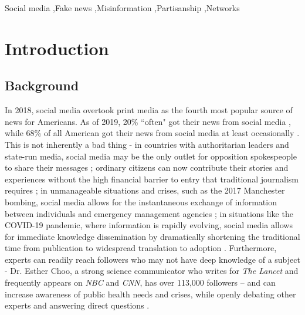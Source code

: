 \documentclass[preprint,review,12pt]{elsarticle}
\begin{document}
\begin{frontmatter}
\begin{abstract}
\end{abstract}



\begin{keyword}
Social media \sep Fake news \sep Misinformation \sep Partisanship \sep Networks
\end{keyword}

\end{frontmatter}

\tableofcontents

\section{Introduction}
\label{introduction}
\subsection{Background}
 In 2018, social media overtook print media as the fourth most popular source of news for Americans. As of 2019, 20\% ``often" got their news from social media \cite{shearer2018social}, while 68\% of all American got their news from social media at least occasionally \cite{matsa2018news}. This is not inherently a bad thing - in countries with authoritarian leaders and state-run media, social media may be the only outlet for opposition spokespeople to share their messages \cite{walker2014breaking}; ordinary citizens can now contribute their stories and experiences without the high financial barrier to entry that traditional journalism requires \cite{qualman2012socialnomics, tapscott2008wikinomics}; in unmanageable situations and crises, such as the 2017 Manchester bombing, social media allows for the instantaneous exchange of information between individuals and emergency management agencies \cite{mirbabaie2020breaking, eriksson2016facebook}; in situations like the COVID-19 pandemic, where information is rapidly evolving, social media allows for immediate knowledge dissemination by dramatically shortening the traditional time from publication to widespread translation to adoption \cite{chan2020social}. Furthermore, experts can readily reach followers who may not have deep knowledge of a subject - Dr. Esther Choo, a strong science communicator who writes for \textit{The Lancet} and frequently appears on \textit{NBC} and \textit{CNN}, has over 113,000 followers – and can increase awareness of public health needs and crises, while openly debating other experts and answering direct questions \cite{gottlieb2020information}.
\end{document}
